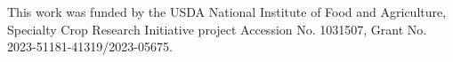 
\setlength{\parskip}{1em}
\setlength{\parindent}{0em}

This work was funded by the USDA National Institute of Food and Agriculture, Specialty Crop Research Initiative project Accession No. 1031507, Grant No. 2023-51181-41319/2023-05675.
